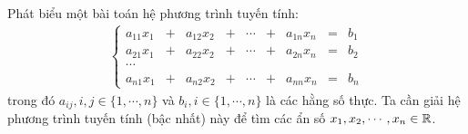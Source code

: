 \documentclass[12pt]{article}
\begin{document}

\sdd





\newpage{}


\newpage{}

Phát biểu một bài toán hệ phương trình tuyến tính:
%  
\begin{align}\label{eq_hepttt}
\left\lbrace \begin{array}{ccccccccc}
a_{11}x_1 &+& a_{12}x_2 &+& \cdots &+& a_{1n}x_n &=& b_1 \\
a_{21}x_1 &+& a_{22}x_2 &+& \cdots &+& a_{2n}x_n &=& b_2 \\
\cdots & & & & &&&&\\
a_{n1}x_1 &+& a_{n2}x_2 &+& \cdots &+& a_{nn}x_n &=& b_n 
        \end{array}
\right.
\end{align}
trong đó $a_{ij}, i, j \in \{1,\cdots,n\}$ và $b_i, i \in \{1,\cdots,n\}$ là các hằng số thực. Ta cần giải hệ phương trình tuyến tính (bậc nhất) này để tìm các ẩn số $x_1, x_2, \cdots, x_n \in {\mathbb{R}}$.

\newpage{}
\end{document}

